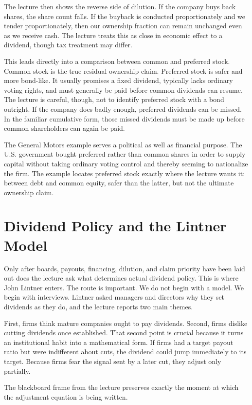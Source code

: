 The lecture then shows the reverse side of dilution. If the company buys back shares, the share count falls. If the buyback is conducted proportionately and we tender proportionately, then our ownership fraction can remain unchanged even as we receive cash. The lecture treats this as close in economic effect to a dividend, though tax treatment may differ.

This leads directly into a comparison between common and preferred stock. Common stock is the true residual ownership claim. Preferred stock is safer and more bond-like. It usually promises a fixed dividend, typically lacks ordinary voting rights, and must generally be paid before common dividends can resume. The lecture is careful, though, not to identify preferred stock with a bond outright. If the company does badly enough, preferred dividends can be missed. In the familiar cumulative form, those missed dividends must be made up before common shareholders can again be paid.

The General Motors example serves a political as well as financial purpose. The U.S. government bought preferred rather than common shares in order to supply capital without taking ordinary voting control and thereby seeming to nationalize the firm. The example locates preferred stock exactly where the lecture wants it: between debt and common equity, safer than the latter, but not the ultimate ownership claim.

\section{Dividend Policy and the Lintner Model}

Only after boards, payouts, financing, dilution, and claim priority have been laid out does the lecture ask what determines actual dividend policy. This is where John Lintner enters. The route is important. We do not begin with a model. We begin with interviews. Lintner asked managers and directors why they set dividends as they do, and the lecture reports two main themes.

First, firms think mature companies ought to pay dividends. Second, firms dislike cutting dividends once established. That second point is crucial because it turns an institutional habit into a mathematical form. If firms had a target payout ratio but were indifferent about cuts, the dividend could jump immediately to its target. Because firms fear the signal sent by a later cut, they adjust only partially.

The blackboard frame from the lecture preserves exactly the moment at which the adjustment equation is being written.

